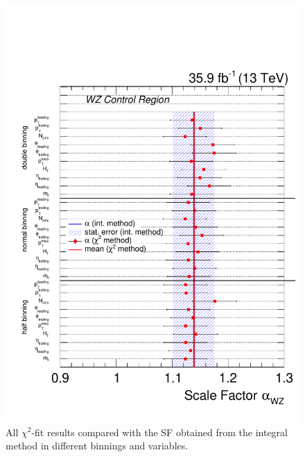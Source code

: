 \begin{figure}[tbp]
 \centering
 \includegraphics[width=\pairwidth]{figures/plots_CR/chi/WZ_Compare}
 \caption{All $\chi^2$-fit results compared with the SF obtained from the integral method in different binnings and variables.}
 \label{fig:chiWZ}
\end{figure}




